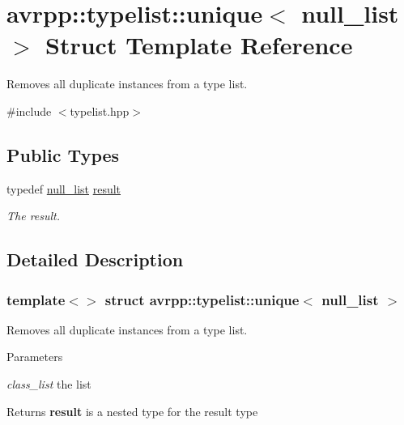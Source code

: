 \hypertarget{structavrpp_1_1typelist_1_1unique_3_01null__list_01_4}{
\section{avrpp::typelist::unique$<$ null\_\-list $>$ Struct Template Reference}
\label{structavrpp_1_1typelist_1_1unique_3_01null__list_01_4}
}


Removes all duplicate instances from a type list.  




{\ttfamily \#include $<$typelist.hpp$>$}

\subsection*{Public Types}
\begin{DoxyCompactItemize}
\item 
typedef \hyperlink{structavrpp_1_1typelist_1_1null__list}{null\_\-list} \hyperlink{structavrpp_1_1typelist_1_1unique_3_01null__list_01_4_a79de2551810ea8d4d107ae62bf4428ab}{result}
\begin{DoxyCompactList}\small\item\em The result. \item\end{DoxyCompactList}\end{DoxyCompactItemize}


\subsection{Detailed Description}
\subsubsection*{template$<$$>$ struct avrpp::typelist::unique$<$ null\_\-list $>$}

Removes all duplicate instances from a type list. 
\begin{DoxyParams}{Parameters}
\item[{\em class\_\-list}]the list \end{DoxyParams}
\begin{DoxyReturn}{Returns}
{\bfseries result} is a nested type for the result type 
\end{DoxyReturn}


